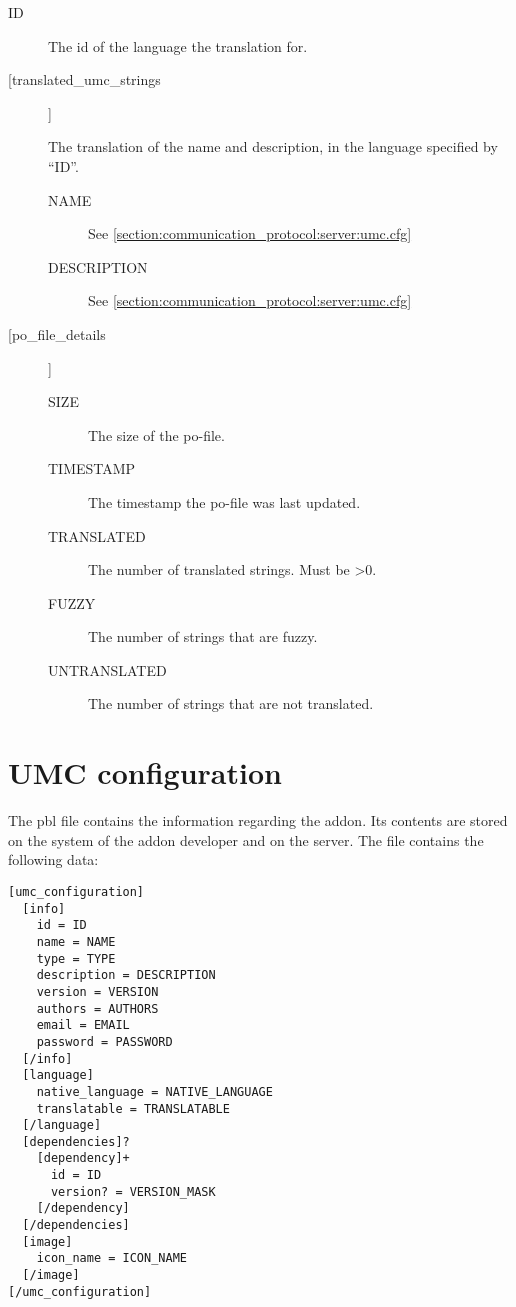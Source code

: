 \begin{description}
\item[ID]
  The id of the language the translation for.

\item[[translated\_umc\_strings]]

  The translation of the name and description, in the language specified by ``ID''.

\begin{description}

\item[NAME]
  See \cref{section:communication_protocol:server:umc.cfg}

\item[DESCRIPTION]
  See \cref{section:communication_protocol:server:umc.cfg}

\end{description}

\item [[po\_file\_details]]
\begin{description}
\item[SIZE]
  The size of the po-file.

\item[TIMESTAMP]
  The timestamp the po-file was last updated.

\item[TRANSLATED]
  The number of translated strings. Must be \textgreater 0.

\item[FUZZY]
  The number of strings that are fuzzy.
  
\item[UNTRANSLATED]
  The number of strings that are not translated.

\end{description}
\end{description}


\section{UMC configuration}
\label{section:communication_protocol:umc}

The pbl file contains the information regarding the addon. Its contents are
stored on the system of the addon developer and on the server. The file
contains the following data:

\begin{lstlisting}
[umc_configuration]
  [info]
    id = ID
    name = NAME
    type = TYPE
    description = DESCRIPTION
    version = VERSION
    authors = AUTHORS
    email = EMAIL
    password = PASSWORD
  [/info]
  [language]
    native_language = NATIVE_LANGUAGE
    translatable = TRANSLATABLE
  [/language]
  [dependencies]?
    [dependency]+
      id = ID
      version? = VERSION_MASK
    [/dependency]
  [/dependencies]
  [image]
    icon_name = ICON_NAME
  [/image]
[/umc_configuration]
\end{lstlisting}

